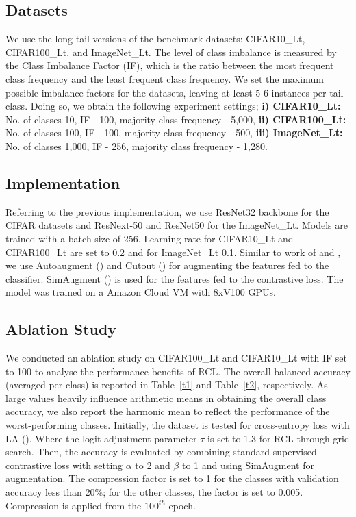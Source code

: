 \subsection{Datasets}
We use the long-tail versions of the benchmark datasets: CIFAR10\_Lt, CIFAR100\_Lt, 
and ImageNet\_Lt. The level of class imbalance is measured by the Class Imbalance Factor (IF), which is the ratio between the most frequent class frequency and the least frequent class frequency. We set the maximum possible imbalance factors for the datasets, leaving at least 5-6 instances per tail class. Doing so, we obtain the following experiment settings; {\bf i) CIFAR10\_Lt:} No. of classes 10, IF - 100, majority class frequency - 5,000, {\bf ii) CIFAR100\_Lt:} No. of classes 100, IF - 100, majority class frequency - 500, {\bf iii) ImageNet\_Lt:} No. of classes 1,000, IF - 256, majority class frequency - 1,280.

\subsection{Implementation}
Referring to the previous implementation, we use ResNet32 
 backbone for the CIFAR datasets and ResNext-50 
and ResNet50 
for the ImageNet\_Lt.
Models are trained with a batch size of 256. Learning rate for CIFAR10\_Lt and CIFAR100\_Lt are set to 0.2  and for ImageNet\_Lt 0.1. Similar to work of \cite{paco} and \cite{bcl}, we use Autoaugment (\cite{autoaug}) and Cutout (\cite{cutout}) for augmenting the features fed to the classifier. SimAugment (\cite{simaugment}) is used for the features fed to the contrastive loss. The model was trained on a Amazon Cloud VM with 8xV100 GPUs.

\subsection{Ablation Study}

We conducted an ablation study on CIFAR100\_Lt and CIFAR10\_Lt with IF set to 100 to analyse the performance benefits of RCL. The overall balanced accuracy (averaged per class) is reported in Table~\ref{t1} and Table~\ref{t2}, respectively. As large values heavily influence arithmetic means in obtaining the overall class accuracy, we also report the harmonic mean to reflect the performance 
of the worst-performing classes. Initially, the dataset is tested for cross-entropy loss with LA (\cite{menon2020long}). Where the logit adjustment parameter $\tau$ is set to 1.3 for RCL through grid search. Then, the accuracy is evaluated by combining standard supervised contrastive loss with setting  $\alpha$ to 2 and $\beta$ to 1 and using SimAugment for augmentation. The compression factor is set to 1 for the classes with validation accuracy less than $20\% $; for the other classes, the factor is set to 0.005. Compression is applied from the $100^{th}$ epoch.

